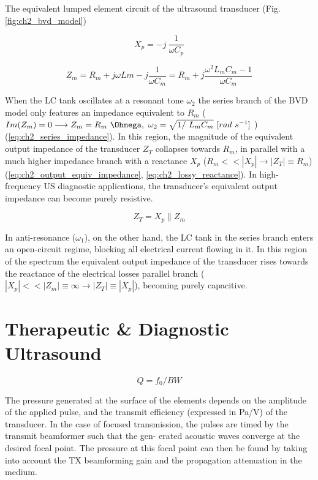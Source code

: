 The equivalent lumped element circuit of the ultrasound transducer (Fig. \ref{fig:ch2_bvd_model}) 

\begin{equation}
  X_p = -j \ \frac{1}{\omega C_p}
  \label{eq:ch2_lossy_reactance}
\end{equation}

\begin{equation}
  Z_m = R_m + j \omega Lm - j \frac{1}{\omega C_m} = R_m + j \frac{\omega^2 L_m C_m - 1}{\omega C_m}
  \label{eq:ch2_series_impedance}
\end{equation}

When the LC tank oscillates at a resonant tone $\omega_2$ the series branch of the BVD model only features an impedance equivalent to $R_m$ ( $Im(Z_m) = 0 \longrightarrow Z_m = R_m \ \Ohmega, \ \omega_2 = \sqrt{1/ \ L_m C_m} \ [rad \ s^{-1}]$ ) (\ref{eq:ch2_series_impedance}). In this 
region, the magnitude of the equivalent output impedance of the transducer $Z_T$ collapses towards $R_m$, in parallel with a much higher impedance branch with a reactance $X_p$ ($R_m << |X_p| \longrightarrow |Z_T| \equiv  R_m$) (\ref{eq:ch2_output_equiv_impedance}, \ref{eq:ch2_lossy_reactance}). In high-frequency US diagnostic applications, the transducer's equivalent output impedance can become purely resistive.

\begin{equation}
  Z_T = X_p \parallel Z_m 
  \label{eq:ch2_output_equiv_impedance}
\end{equation}

In anti-resonance ($\omega_1$), on the other hand, the LC tank in the series branch enters an open-circuit regime, blocking all electrical current flowing in it. In this region of the spectrum the equivalent output impedance of the transducer rises towards the reactance of the electrical losses parallel branch ($|X_p| << |Z_m| \equiv \infty \longrightarrow |Z_T| \equiv |X_p|$), becoming purely capacitive. 



\section{Therapeutic \& Diagnostic Ultrasound}
\label{sec:ultrasound_imaging}

\begin{equation}
  Q = f_0 / BW
  \label{eq:q_factor}
\end{equation}

The pressure generated at the surface of the elements depends on the 
amplitude of the applied pulse, and the transmit efficiency (expressed in Pa/V) 
of the transducer. In the case of focused transmission, the pulses are timed by 
the transmit beamformer such that the gen- erated acoustic waves converge at the 
desired focal point. The pressure at this focal point can then be found by taking 
into account the TX beamforming gain and the propagation attenuation in the medium. 

